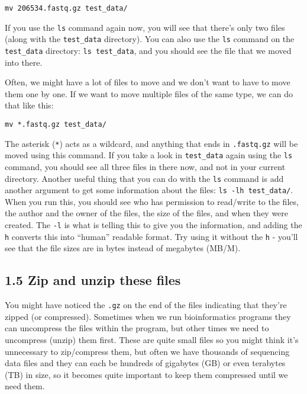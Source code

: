 \documentclass[
]{book}
\begin{document}
\begin{verbatim}
mv 206534.fastq.gz test_data/
\end{verbatim}

If you use the \texttt{ls} command again now, you will see that there's only two files (along with the \texttt{test\_data} directory). You can also use the \texttt{ls} command on the \texttt{test\_data} directory: \texttt{ls\ test\_data}, and you should see the file that we moved into there.

Often, we might have a lot of files to move and we don't want to have to move them one by one. If we want to move multiple files of the same type, we can do that like this:

\begin{verbatim}
mv *.fastq.gz test_data/
\end{verbatim}

The asterisk (\texttt{*}) acts as a wildcard, and anything that ends in \texttt{.fastq.gz} will be moved using this command. If you take a look in \texttt{test\_data} again using the \texttt{ls} command, you should see all three files in there now, and not in your current directory. Another useful thing that you can do with the \texttt{ls} command is add another argument to get some information about the files: \texttt{ls\ -lh\ test\_data/}. When you run this, you should see who has permission to read/write to the files, the author and the owner of the files, the size of the files, and when they were created. The \texttt{-l} is what is telling this to give you the information, and adding the \texttt{h} converts this into ``human'' readable format. Try using it without the \texttt{h} - you'll see that the file sizes are in bytes instead of megabytes (MB/M).

\subsection{1.5 Zip and unzip these files}\label{zip-and-unzip-these-files}

You might have noticed the \texttt{.gz} on the end of the files indicating that they're zipped (or compressed). Sometimes when we run bioinformatics programs they can uncompress the files within the program, but other times we need to uncompress (unzip) them first. These are quite small files so you might think it's unnecessary to zip/compress them, but often we have thousands of sequencing data files and they can each be hundreds of gigabytes (GB) or even terabytes (TB) in size, so it becomes quite important to keep them compressed until we need them.
\end{document}
